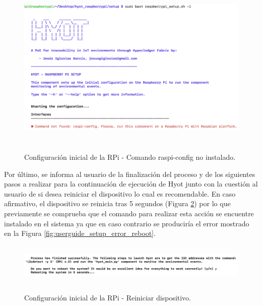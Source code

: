 \documentclass[12pt,a4paper, twoside]{report}
\begin{document}
	\begin{figure}[!ht]   
		\caption{Configuración inicial de la RPi - Comando raspi-config no instalado.} 
		\begin{center} 
			\includegraphics[width=14cm,height=8cm]{Images/userGuide/setup/raspiConfig} \\
			\label{fig:userguide_setup_error_raspiconfig} 
		\end{center}  
	\end{figure}
	
	Por último, se informa al usuario de la finalización del proceso y de los siguientes pasos a realizar para la continuación de ejecución de Hyot junto con la cuestión al usuario de si desea reiniciar el dispositivo lo cual es recomendable. En caso afirmativo, el dispositivo se reinicia tras 5 segundos (Figura \ref{fig:userguide_setup_reboot}) por lo que previamente se comprueba que el comando para realizar esta acción se encuentre instalado en el sistema ya que en caso contrario se produciría el error mostrado en la Figura \ref{fig:userguide_setup_error_reboot}. 

	\begin{figure}[!ht]   
		\caption{Configuración inicial de la RPi - Reiniciar dispositivo.} 
		\begin{center} 
			\includegraphics[width=17cm,height=2cm]{Images/userGuide/setup/reboot} \\
			\label{fig:userguide_setup_reboot} 
		\end{center}  
	\end{figure}
	
\end{document}
